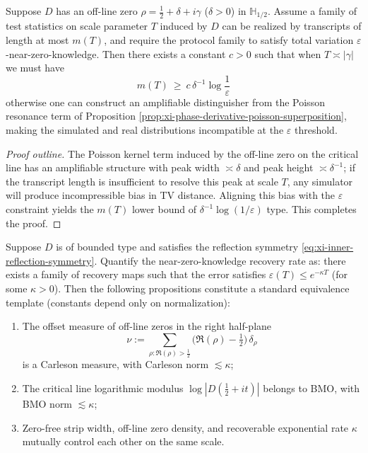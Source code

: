 \begin{proposition}\label{prop:xi-offcritical-zero-forces-transcript-length}
Suppose \(D\) has an off-line zero \(\rho=\tfrac12+\delta+i\gamma\) (\(\delta>0\)) in \(\mathbb{H}_{1/2}\).
Assume a family of test statistics on scale parameter \(T\) induced by \(D\) can be realized by transcripts of length at most \(m(T)\),
and require the protocol family to satisfy total variation \(\varepsilon\)-near-zero-knowledge.
Then there exists a constant \(c>0\) such that when \(T\asymp|\gamma|\) we must have
\[
\boxed{\;
m(T)\ \ge\ c\,\delta^{-1}\log\!\frac{1}{\varepsilon}\;}
\]
otherwise one can construct an amplifiable distinguisher from the Poisson resonance term of Proposition \ref{prop:xi-phase-derivative-poisson-superposition}, making the simulated and real distributions incompatible at the \(\varepsilon\) threshold.
\end{proposition}
\begin{proof}[Proof outline]
The Poisson kernel term induced by the off-line zero on the critical line has an amplifiable structure with peak width \(\asymp\delta\) and peak height \(\asymp\delta^{-1}\);
if the transcript length is insufficient to resolve this peak at scale \(T\), any simulator will produce incompressible bias in TV distance.
Aligning this bias with the \(\varepsilon\) constraint yields the \(m(T)\) lower bound of \(\delta^{-1}\log(1/\varepsilon)\) type. This completes the proof.
\end{proof}

\begin{theorem}\label{thm:xi-carleson-bmo-recovery-template}
Suppose \(D\) is of bounded type and satisfies the reflection symmetry \eqref{eq:xi-inner-reflection-symmetry}.
Quantify the near-zero-knowledge recovery rate as: there exists a family of recovery maps such that the error satisfies \(\varepsilon(T)\le e^{-\kappa T}\) (for some \(\kappa>0\)).
Then the following propositions constitute a standard equivalence template (constants depend only on normalization):
\begin{enumerate}
  \item The offset measure of off-line zeros in the right half-plane
  \[
  \nu:=\sum_{\rho:\Re(\rho)>\frac12}\bigl(\Re(\rho)-\tfrac12\bigr)\,\delta_{\rho}
  \]
  is a Carleson measure, with Carleson norm \(\lesssim \kappa\);
  \item The critical line logarithmic modulus \(\log|D(\tfrac12+it)|\) belongs to BMO, with BMO norm \(\lesssim \kappa\);
  \item Zero-free strip width, off-line zero density, and recoverable exponential rate \(\kappa\) mutually control each other on the same scale.
\end{enumerate}
\end{theorem}

